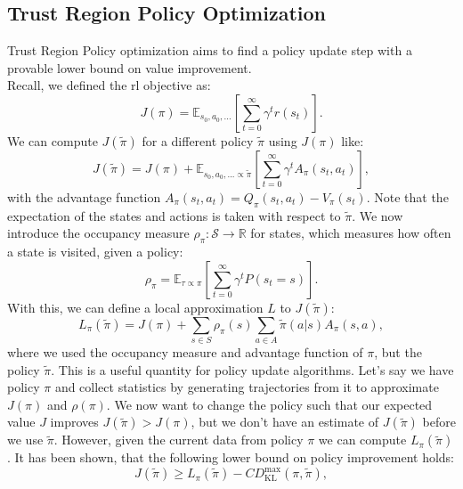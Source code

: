 \subsection{Trust Region Policy Optimization}
\label{sec:TRPO}
Trust Region Policy optimization \cite{TRPO} aims to find a policy update step with a provable lower bound on value improvement.\\ 
Recall, we defined the \ac{rl} objective as:
\begin{equation}
    J(\pi) = \mathbb{E}_{s_0, a_0, ...}\left[\sum_{t=0}^{\infty}  \gamma^t r(s_t) \right].
\end{equation}
We can compute $J(\tilde{\pi})$ for a different policy $\tilde{\pi}$ using $J(\pi)$ like:
\begin{equation}
    J(\tilde{\pi}) = J(\pi) + \mathbb{E}_{s_0, a_0, ... \propto \tilde{\pi}}\left[ \sum_{t=0}^{\infty}  \gamma^t A_{\pi}(s_t, a_t)\right],
\end{equation}
with the advantage function $A_{\pi}(s_t, a_t) = Q_{\pi}(s_t,a_t) - V_{\pi}(s_t)$. Note that the expectation of the states and actions is taken with respect to 
$\tilde{\pi}$. 
We now introduce the occupancy measure $\rho_{\pi}:\mathcal{S} \rightarrow \mathbb{R}$ for states, which measures how often a state is visited, given a policy:
\begin{equation*}
    \rho_{\pi} = \mathbb{E}_{\tau \propto \pi} \left[ \sum_{t=0}^\infty \gamma^t P(s_t=s) \right].
\end{equation*}
With this, we can define a local approximation $L$ to $J(\tilde{\pi})$:
\begin{equation}
    L_{\pi}(\tilde{\pi}) = J(\pi) + \sum_{s \in S} \rho_{\pi}(s) \sum_{a \in A} \tilde{\pi}(a|s) A_{\pi}(s,a),
\end{equation}
where we used the occupancy measure and advantage function of $\pi$, but the policy $\tilde{\pi}$. This is a useful quantity for policy update algorithms. 
Let's say we have policy $\pi$ and collect statistics by generating trajectories from it to approximate $J(\pi)$ and $\rho(\pi)$. We now want to change the policy 
such that our expected value $J$ improves $J(\tilde{\pi}) > J(\pi)$, but we don't have an estimate of $J(\tilde{\pi})$ before we use $\tilde{\pi}$. 
However, given the current data from policy $\pi$ we can compute $L_{\pi}(\tilde{\pi})$. It has been shown, that the following lower bound on policy 
improvement holds:
\begin{equation*}
    J(\tilde{\pi}) \geq L_{\pi}(\tilde{\pi}) - C D^{\max}_{\operatorname{KL}} (\pi,\tilde{\pi}),
\end{equation*}
